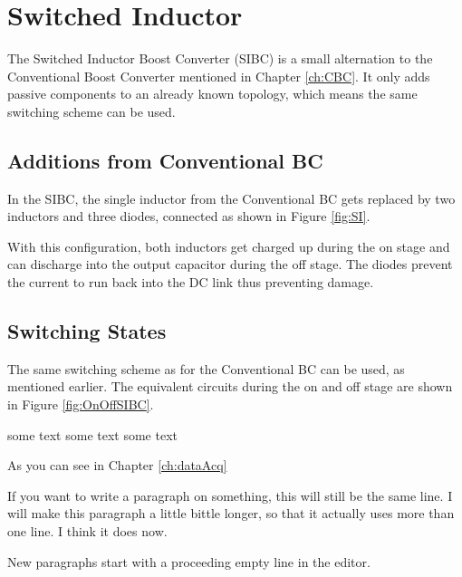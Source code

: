 \section{Switched Inductor}\label{ch:SIBC}
The Switched Inductor Boost Converter (SIBC) is a small alternation to the Conventional Boost Converter mentioned in Chapter \ref{ch:CBC}.
It only adds passive components to an already known topology,
which means the same switching scheme can be used.
\subsection{Additions from Conventional BC}
In the SIBC,
the single inductor from the Conventional BC gets replaced by two inductors and three diodes,
connected as shown in Figure \ref{fig:SI}.

 \label{fig:SI}

With this configuration,
both inductors get charged up during the on stage
and can discharge into the output capacitor during the off stage.
The diodes prevent the current to run back into the DC link 
thus preventing damage.


\subsection{Switching States}
The same switching scheme as for the Conventional BC can be used,
as mentioned earlier.
The equivalent circuits during the on and off stage are shown in Figure \ref{fig:OnOffSIBC}.

\label{fig:OnOffSIBC}

some text
some text
some text

As you can see in Chapter \ref{ch:dataAcq}

If you want to write a paragraph on something,
this will still be the same line.
I will make this paragraph a little bittle longer,
so that it actually uses more than one line.
I think it does now.

New paragraphs start with a proceeding empty line in the editor.